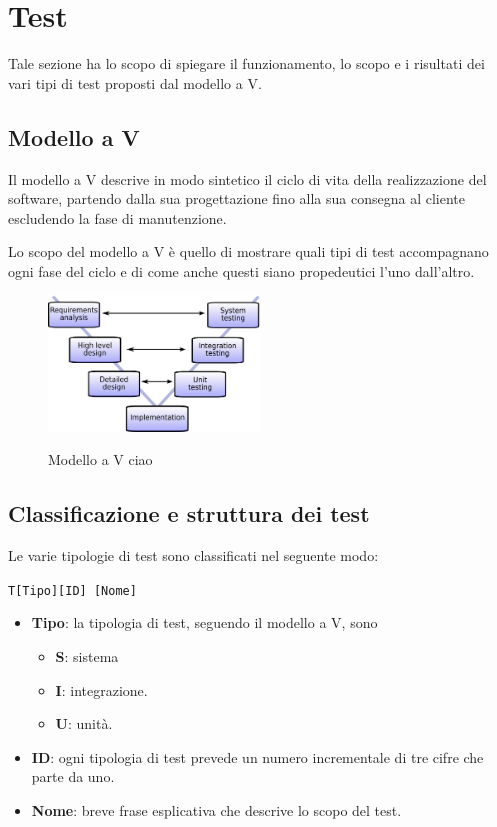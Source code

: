 \section{Test}

Tale sezione ha lo scopo di spiegare il funzionamento, lo scopo e i risultati dei vari tipi di test proposti dal modello a V.

\subsection{Modello a V}
Il modello a V descrive in modo sintetico il ciclo di vita della realizzazione del software, partendo dalla sua progettazione fino alla sua consegna al cliente escludendo la fase di manutenzione.

Lo scopo del modello a V è quello di mostrare quali tipi di test accompagnano ogni fase del ciclo e di come anche questi siano propedeutici l'uno dall'altro.

\begin{figure}[H]
	\centering
	\includegraphics[width=0.5\textwidth]{img/V-model.png}
	\label{img:vmodel}
	\caption{Modello a V ciao \protect\footnotemark}
\end{figure}


\subsection{Classificazione e struttura dei test}
Le varie tipologie di test sono classificati nel seguente modo:

\begin{center}
	\texttt{T[Tipo][ID] [Nome]}
\end{center}

\begin{itemize}
	\item \textbf{Tipo}: la tipologia di test, seguendo il modello a V, sono
	\begin{itemize}
		\item \textbf{S}: sistema
		\item \textbf{I}: integrazione.
		\item \textbf{U}: unità.
	\end{itemize}
	\item \textbf{ID}: ogni tipologia di test prevede un numero incrementale di tre cifre che parte da uno.
	\item \textbf{Nome}: breve frase esplicativa che descrive lo scopo del test.
\end{itemize}

